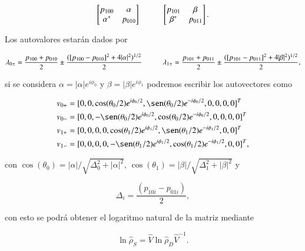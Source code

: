 \begin{appendixs}
\begin{equation*}
    \begin{bmatrix}
        p_{100} & \alpha \\
        \alpha^{*} & p_{010}
    \end{bmatrix}
    \hspace{10mm}
    \begin{bmatrix}
        p_{101} & \beta \\
        \beta^{*} & p_{011}
    \end{bmatrix}.
\end{equation*}

Los autovalores estarán dados por

\begin{equation*}
    \lambda_{0\pm} = \frac{ p_{100} +p_{010} }{2} \pm \frac{( [p_{100} - p_{010}]^{2} + 4|\alpha|^{2} )^{1/2} }{ 2 }  \hspace{10mm}      \lambda_{1\pm} = \frac{ p_{101} +p_{011} }{2} \pm \frac{( [p_{101} - p_{011}]^{2} + 4|\beta|^{2} )^{1/2} }{ 2 }, 
\end{equation*}

si se considera $\alpha = |\alpha|e^{i\phi_{0}}$ y $\beta = |\beta|e^{i\phi_{1}}$ podremos escribir los autovectores como

\begin{align*}
    v_{0+} &  = [0,0,\cos(\theta_{0}/2)e^{i\phi_{0}/2},\sen(\theta_{0}/2)e^{-i\phi_{0}/2},0,0,0,0]^{T} \\
    v_{0-} &  = [0,0,-\sen(\theta_{0}/2)e^{i\phi_{0}/2},\cos(\theta_{0}/2)e^{-i\phi_{0}/2},0,0,0,0]^{T} \\
    v_{1+} &  = [0,0,0,0,\cos(\theta_{1}/2)e^{i\phi_{1}/2},\sen(\theta_{1}/2)e^{-i\phi_{1}/2},0,0]^{T} \\
    v_{1-} &  = [0,0,0,0,-\sen(\theta_{1}/2)e^{i\phi_{1}/2},\cos(\theta_{1}/2)e^{-i\phi_{1}/2},0,0]^{T},                   
\end{align*}

con $\cos(\theta_{0}) = |\alpha|/\sqrt{\Delta^{2}_{0} + |\alpha|^{2}}$, $\cos(\theta_{1}) = |\beta|/\sqrt{\Delta^{2}_{1} + |\beta|^{2}}$ y

\begin{equation*}
    \Delta_{i} = \frac{(p_{10i} - p_{01i})}{2},
\end{equation*}

con esto se podrá obtener el logaritmo natural de la matriz mediante

\begin{equation*}
    \ln \hat{\rho}_{S} = \hat{V}\ln \hat{\rho}_{D} \hat{V}^{-1}.
\end{equation*}
    

\end{appendixs}
